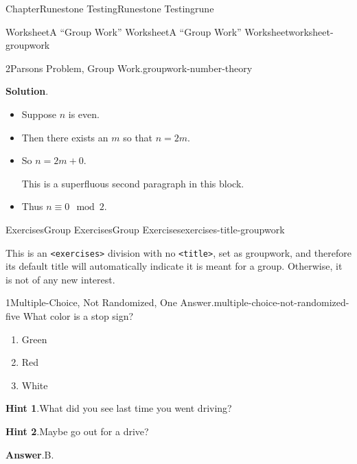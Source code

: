 \documentclass[oneside,10pt,]{book}
\newcommand{\blocktitlefont}{\relax}
\newcommand{\mono}[1]{\texttt{#1}}
\numberwithin{equation}{section}
\begin{document}
\begin{chapterptx}{Chapter}{Runestone Testing}{}{Runestone Testing}{}{}{rune}
\begin{worksheet-section}{Worksheet}{A ``Group Work'' Worksheet}{}{A ``Group Work'' Worksheet}{}{}{worksheet-groupwork}
\begin{divisionexercise}{2}{Parsons Problem, Group Work.}{}{groupwork-number-theory}
\begin{itemize}[label=\textbullet]
%
\end{itemize}
%
\par\smallskip%
\noindent\textbf{\blocktitlefont Solution}.\hypertarget{groupwork-number-theory-5}{}\quad{}%
\begin{itemize}[label=\textbullet]
\item{}Suppose \(n\) is even.%
\item{}Then there exists an \(m\) so that \(n = 2m\).%
\item{}So \(n = 2m + 0\).%
\par
This is a superfluous second paragraph in this block.%
\item{}Thus \(n\equiv 0\mod 2\).%
\end{itemize}
%
\end{divisionexercise}%
\end{worksheet-section}
\restoregeometry
%
%
\typeout{************************************************}
\typeout{************************************************}
%
\begin{exercises-section}{Exercises}{Group Exercises}{}{Group Exercises}{}{}{exercises-title-groupwork}
\begin{introduction}{}%
This is an \mono{<exercises>} division with no \mono{<title>}, set as groupwork, and therefore its default title will automatically indicate it is meant for a group.  Otherwise, it is not of any new interest.%
\end{introduction}%
\begin{divisionexercise}{1}{Multiple-Choice, Not Randomized, One Answer.}{}{multiple-choice-not-randomized-five}%
%
What color is a stop sign?%
\par
%
\begin{enumerate}[label={\Alph*.}]
\item{}Green%
\item{}Red%
\item{}White%
\end{enumerate}
%
\par\smallskip%
\noindent\textbf{\blocktitlefont Hint 1}.\hypertarget{multiple-choice-not-randomized-five-4}{}\quad{}What did you see last time you went driving?%
\par\smallskip%
\noindent\textbf{\blocktitlefont Hint 2}.\hypertarget{multiple-choice-not-randomized-five-5}{}\quad{}Maybe go out for a drive?%
\par\smallskip%
\noindent\textbf{\blocktitlefont Answer}.\hypertarget{multiple-choice-not-randomized-five-6}{}\quad{}B.%

\end{divisionexercise}
\end{exercises-section}
\end{chapterptx}
\end{document}
